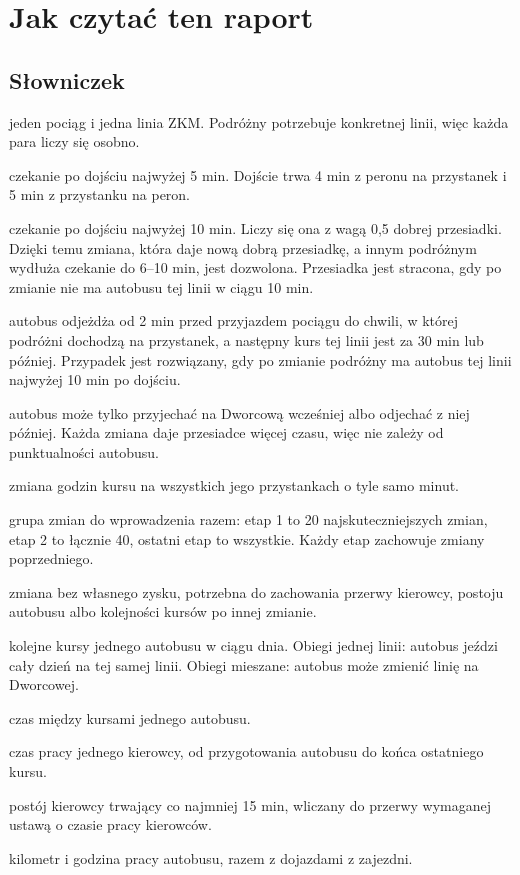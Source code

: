 \documentclass[10pt,a4paper]{article}
\begin{document}
\section*{Jak czytać ten raport}
\subsection*{Słowniczek}
\begin{description}[itemsep=1pt, leftmargin=0pt]
\item[Para pociąg--linia] jeden pociąg i jedna linia ZKM. Podróżny potrzebuje konkretnej linii, więc każda para liczy się osobno.
\item[Dobra przesiadka] czekanie po dojściu najwyżej 5 min. Dojście trwa 4 min z peronu na przystanek i 5 min z przystanku na peron.
\item[Przesiadka z czekaniem do 10 min] czekanie po dojściu najwyżej 10 min. Liczy się ona z wagą 0,5 dobrej przesiadki. Dzięki temu zmiana, która daje nową dobrą przesiadkę, a innym podróżnym wydłuża czekanie do 6--10 min, jest dozwolona. Przesiadka jest stracona, gdy po zmianie nie ma autobusu tej linii w ciągu 10 min.
\item[Odjazd „uciekający”] autobus odjeżdża od 2 min przed przyjazdem pociągu do chwili, w której podróżni dochodzą na przystanek, a następny kurs tej linii jest za 30 min lub później. Przypadek jest rozwiązany, gdy po zmianie podróżny ma autobus tej linii najwyżej 10 min po dojściu.
\item[Kierunek przesunięć] autobus może tylko przyjechać na Dworcową wcześniej albo odjechać z niej później. Każda zmiana daje przesiadce więcej czasu, więc nie zależy od punktualności autobusu.
\item[Przesunięcie kursu] zmiana godzin kursu na wszystkich jego przystankach o tyle samo minut.
\item[Etap] grupa zmian do wprowadzenia razem: etap 1 to 20 najskuteczniejszych zmian, etap 2 to łącznie 40, ostatni etap to wszystkie. Każdy etap zachowuje zmiany poprzedniego.
\item[Zmiana towarzysząca] zmiana bez własnego zysku, potrzebna do zachowania przerwy kierowcy, postoju autobusu albo kolejności kursów po innej zmianie.
\item[Obieg] kolejne kursy jednego autobusu w ciągu dnia. Obiegi jednej linii: autobus jeździ cały dzień na tej samej linii. Obiegi mieszane: autobus może zmienić linię na Dworcowej.
\item[Postój] czas między kursami jednego autobusu.
\item[Służba] czas pracy jednego kierowcy, od przygotowania autobusu do końca ostatniego kursu.
\item[Przerwa] postój kierowcy trwający co najmniej 15 min, wliczany do przerwy wymaganej ustawą o czasie pracy kierowców.
\item[Wozokilometr, wozogodzina] kilometr i godzina pracy autobusu, razem z dojazdami z zajezdni.
\end{description}
\end{document}
